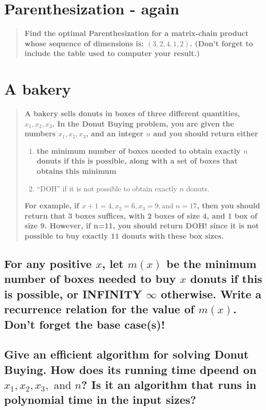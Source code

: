 \documentclass[titlepage]{article}\usepackage[]{graphicx}\usepackage[]{color}
\begin{document}
\section{Parenthesization - again }
\begin{quote}
 \textbf{ Find the optimal Parenthesization for a matrix-chain product whose sequence
  of dimensions is: $(3,2,4,1,2)$. (Don't forget to include the table used to
computer your result.)}
\end{quote}



\section{A bakery }
\begin{quote}
  \textbf{A bakery sells donuts in boxes of three different quantities, $x_1, x_2,
  x_3$. In the Donut Buying problem, you are given the numbers $x_1, x_2,
x_3$, and an integer $n$ and you should return either }
  \begin{enumerate}
	\item \textbf{the minimum number of boxes needed to obtain exactly $n$ donuts if
	this is possible, along with a set of boxes that obtains this minimum}
	  \item ``DOH'' if it is not possible to obtain exactly $n$ donuts. 
  \end{enumerate}
  \textbf{For example, if $x+1 = 4, x_2 =6, x_3 = 9, \text{and } n=17$, then you should
  return that 3 boxes suffices, with 2 boxes of size 4, and 1 box of size 9.
  However, if n=11, you should return DOH! since it is not possible to buy
exactly 11 donuts with these box sizes. }
\end{quote}

\subsection{For any positive $x$, let $m(x)$ be the minimum number of boxes
  needed to buy $x$ donuts if this is possible, or INFINITY $\infty$
  otherwise. Write a recurrence relation for the value of $m(x)$. Don't forget
the base case(s)!}



\subsection{ Give an efficient algorithm for solving Donut Buying. How does its
  running time dpeend on $x_1, x_2, x_3,\text{ and } n$? Is it an algorithm
that runs in polynomial time in the input sizes?} 
\end{document}
